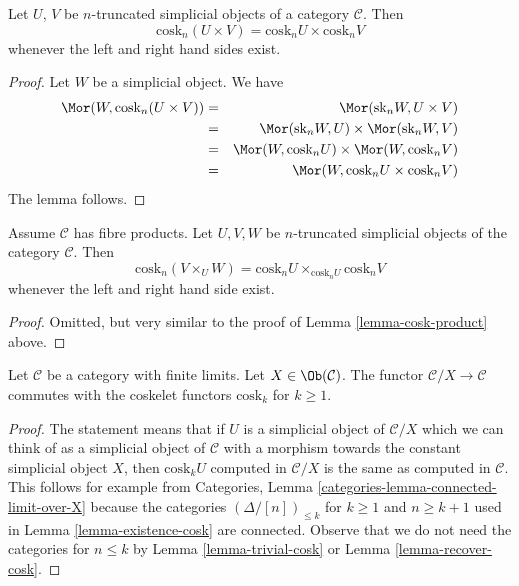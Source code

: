 \begin{lemma}
\label{lemma-cosk-product}
Let $U$, $V$ be $n$-truncated simplicial objects of a
category $\mathcal{C}$. Then
$$
\text{cosk}_n (U \times V) = \text{cosk}_nU \times \text{cosk}_nV
$$
whenever the left and right hand sides exist.
\end{lemma}

\begin{proof}
Let $W$ be a simplicial object. We have
\begin{eqnarray*}
\Mor(W, \text{cosk}_n (U \times V))
& = &
\Mor(\text{sk}_n W, U \times V) \\
& = &
\Mor(\text{sk}_n W, U)
\times
\Mor(\text{sk}_nW, V) \\
& = &
\Mor(W, \text{cosk}_n U)
\times
\Mor(W, \text{cosk}_n V) \\
& = &
\Mor(W, \text{cosk}_n U \times \text{cosk}_n V)
\end{eqnarray*}
The lemma follows.
\end{proof}

\begin{lemma}
\label{lemma-cosk-fibre-product}
Assume $\mathcal{C}$ has fibre products.
Let $U, V, W$ be $n$-truncated simplicial objects of the
category $\mathcal{C}$. Then
$$
\text{cosk}_n (V \times_U W)
=
\text{cosk}_nU \times_{\text{cosk}_n U} \text{cosk}_nV
$$
whenever the left and right hand side exist.
\end{lemma}

\begin{proof}
Omitted, but very similar to the proof of
Lemma \ref{lemma-cosk-product} above.
\end{proof}

\begin{lemma}
\label{lemma-cosk-above-object}
Let $\mathcal{C}$ be a category with finite limits.
Let $X \in \Ob(\mathcal{C})$.
The functor $\mathcal{C}/X \to \mathcal{C}$ commutes with
the coskelet functors $\text{cosk}_k$ for $k \geq 1$.
\end{lemma}

\begin{proof}
The statement means that if $U$ is a simplicial object of $\mathcal{C}/X$
which we can think of as a simplicial object of $\mathcal{C}$ with a morphism
towards the constant simplicial object $X$, then $\text{cosk}_k U$
computed in $\mathcal{C}/X$ is the same as computed in $\mathcal{C}$.
This follows for example from
Categories, Lemma \ref{categories-lemma-connected-limit-over-X}
because the categories $(\Delta/[n])_{\leq k}$ for $k \geq 1$ and
$n \geq k + 1$ used in Lemma \ref{lemma-existence-cosk}
are connected. Observe that we do not need the categories
for $n \leq k$ by Lemma \ref{lemma-trivial-cosk} or
Lemma \ref{lemma-recover-cosk}.
\end{proof}

